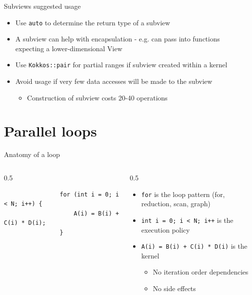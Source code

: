 \documentclass[
    aspectratio=169,
    \createHandout
]{beamer}
\begin{document}
\begin{frame}[fragile]{Subviews suggested usage}
    \begin{itemize}
        \item Use \texttt{auto} to determine the return type of a subview
        \item A subview can help with encapsulation - e.g. can pass into functions expecting a lower-dimensional View
        \item Use \texttt{Kokkos::pair} for partial ranges if subview created within a kernel
        \item Avoid usage if very few data accesses will be made to the subview
        \begin{itemize}
            \item Construction of subview costs 20-40 operations
        \end{itemize}
    \end{itemize}
\end{frame}


\section{Parallel loops}


\begin{frame}[fragile]{Anatomy of a loop}
    \begin{columns}
        \begin{column}{0.5\linewidth}
            \begin{verbatim}
                for (int i = 0; i < N; i++) {
                    A(i) = B(i) + C(i) * D(i);
                }
            \end{verbatim}
        \end{column}
        \begin{column}{0.5\linewidth}
            \begin{itemize}
                \item \texttt{for} is the loop pattern (for, reduction, scan, graph)
                \item \texttt{int i = 0; i < N; i++} is the execution policy
                \item \texttt{A(i) = B(i) + C(i) * D(i)} is the kernel
                \begin{itemize}
                    \item No iteration order dependencies
                    \item No side effects
                \end{itemize}
            \end{itemize}
        \end{column}
    \end{columns}
\end{frame}
\end{document}
